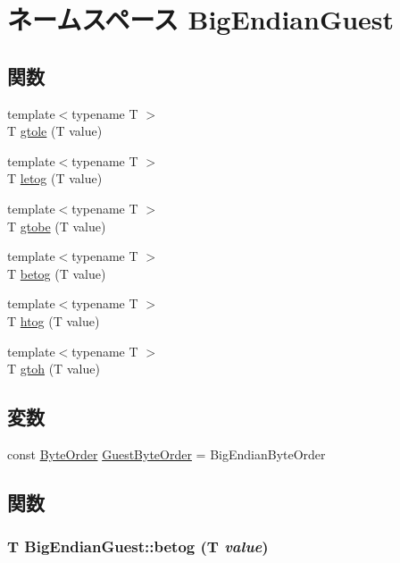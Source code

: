 \hypertarget{namespaceBigEndianGuest}{
\section{ネームスペース BigEndianGuest}
\label{namespaceBigEndianGuest}
}
\subsection*{関数}
\begin{DoxyCompactItemize}
\item 
{\footnotesize template$<$typename T $>$ }\\T \hyperlink{namespaceBigEndianGuest_aeab167e8a814d73ceb79ff46de96ba0d}{gtole} (T value)
\item 
{\footnotesize template$<$typename T $>$ }\\T \hyperlink{namespaceBigEndianGuest_a245baef980523bf81f2285b1fa3e74b8}{letog} (T value)
\item 
{\footnotesize template$<$typename T $>$ }\\T \hyperlink{namespaceBigEndianGuest_ad77d11499d6bfb2b207b17cb7319f5ec}{gtobe} (T value)
\item 
{\footnotesize template$<$typename T $>$ }\\T \hyperlink{namespaceBigEndianGuest_a50d31a883b3eda39db344a37f8381fe6}{betog} (T value)
\item 
{\footnotesize template$<$typename T $>$ }\\T \hyperlink{namespaceBigEndianGuest_a10c3370b6af5a1216a2a64c0d379f788}{htog} (T value)
\item 
{\footnotesize template$<$typename T $>$ }\\T \hyperlink{namespaceBigEndianGuest_adb51b41dd17278558edf419359f52de6}{gtoh} (T value)
\end{DoxyCompactItemize}
\subsection*{変数}
\begin{DoxyCompactItemize}
\item 
const \hyperlink{byteswap_8hh_aaeb92d42f5a6e27b8ba19f18d69d142b}{ByteOrder} \hyperlink{namespaceBigEndianGuest_aef5e34cb4383d2b11025693e07673656}{GuestByteOrder} = BigEndianByteOrder
\end{DoxyCompactItemize}


\subsection{関数}
\hypertarget{namespaceBigEndianGuest_a50d31a883b3eda39db344a37f8381fe6}{
\subsubsection[{betog}]{\setlength{\rightskip}{0pt plus 5cm}T BigEndianGuest::betog (T {\em value})}}
\label{namespaceBigEndianGuest_a50d31a883b3eda39db344a37f8381fe6}



